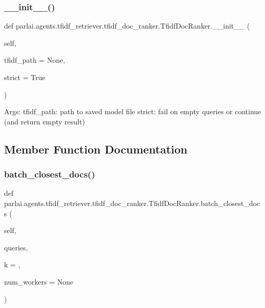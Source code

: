 \subsubsection{\texorpdfstring{\+\_\+\+\_\+init\+\_\+\+\_\+()}{\_\_init\_\_()}}
{\footnotesize\ttfamily def parlai.\+agents.\+tfidf\+\_\+retriever.\+tfidf\+\_\+doc\+\_\+ranker.\+Tfidf\+Doc\+Ranker.\+\_\+\+\_\+init\+\_\+\+\_\+ (\begin{DoxyParamCaption}\item[{}]{self,  }\item[{}]{tfidf\+\_\+path = {\ttfamily None},  }\item[{}]{strict = {\ttfamily True} }\end{DoxyParamCaption})}

\begin{DoxyVerb}Args:
    tfidf_path: path to saved model file
    strict: fail on empty queries or continue (and return empty result)
\end{DoxyVerb}
 

\subsection{Member Function Documentation}
\mbox{\label{classparlai_1_1agents_1_1tfidf__retriever_1_1tfidf__doc__ranker_1_1TfidfDocRanker_a3ed4fd5025cc8b1996efc9354ccc8e54}} 
\subsubsection{\texorpdfstring{batch\+\_\+closest\+\_\+docs()}{batch\_closest\_docs()}}
{\footnotesize\ttfamily def parlai.\+agents.\+tfidf\+\_\+retriever.\+tfidf\+\_\+doc\+\_\+ranker.\+Tfidf\+Doc\+Ranker.\+batch\+\_\+closest\+\_\+docs (\begin{DoxyParamCaption}\item[{}]{self,  }\item[{}]{queries,  }\item[{}]{k = {},  }\item[{}]{num\+\_\+workers = {\ttfamily None} }\end{DoxyParamCaption})}

